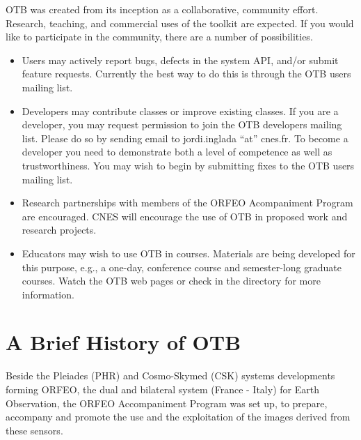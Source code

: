 OTB was created from its inception as a collaborative, community
effort. Research, teaching, and commercial uses of the toolkit are
expected. If you would like to participate in the community, there are a
number of possibilities.

\begin{itemize}
       \item Users may actively report bugs, defects in the system API,
       and/or submit feature requests. Currently the best way to do this is
       through the OTB users mailing list.

       \item Developers may contribute classes or improve existing
       classes. If you are a developer, you may request permission to join
       the OTB developers mailing list. Please do so by sending email to
       jordi.inglada ``at'' cnes.fr. To become a developer you need to
       demonstrate both a level of competence as well as
       trustworthiness. You may wish to begin by submitting fixes to the OTB
       users mailing list.

       \item Research partnerships with members of the ORFEO
       Acompaniment Program are encouraged. CNES will encourage the use of
       OTB in proposed work and research projects.


       \item Educators may wish to use OTB in courses. Materials are being
       developed for this purpose, e.g., a one-day, conference course and
       semester-long graduate courses. Watch the OTB web pages or check in
       the  directory for more information.
\end{itemize}

\section{A Brief History of OTB}
\label{sec:History}



Beside the Pleiades (PHR) and Cosmo-Skymed (CSK) systems developments forming ORFEO, the dual and bilateral system (France - Italy) for Earth Observation, the ORFEO Accompaniment Program was set up, to prepare, accompany and promote the use and the exploitation of the images derived from these sensors.

